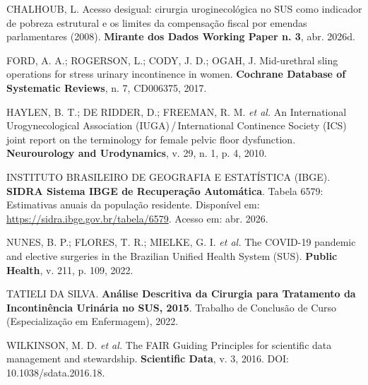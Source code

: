 \documentclass[12pt,a4paper,oneside]{article}
\begin{document}
\begin{singlespace}
\noindent\hangindent=1.25cm
CHALHOUB, L. Acesso desigual: cirurgia uroginecológica no SUS
como indicador de pobreza estrutural e os limites da
compensação fiscal por emendas parlamentares
(2008). \textbf{Mirante dos Dados \textemdash{}
Working Paper n. 3}, abr. 2026d.\par\smallskip

\noindent\hangindent=1.25cm
FORD, A. A.; ROGERSON, L.; CODY, J. D.; OGAH, J. Mid-urethral
sling operations for stress urinary incontinence in women.
\textbf{Cochrane Database of Systematic Reviews}, n. 7,
CD006375, 2017.\par\smallskip

\noindent\hangindent=1.25cm
HAYLEN, B. T.; DE RIDDER, D.; FREEMAN, R. M. \textit{et al.}
An International Urogynecological Association
(IUGA)\,/\,International Continence Society (ICS) joint report
on the terminology for female pelvic floor dysfunction.
\textbf{Neurourology and Urodynamics}, v. 29, n. 1,
p. 4, 2010.\par\smallskip

\noindent\hangindent=1.25cm
INSTITUTO BRASILEIRO DE GEOGRAFIA E ESTATÍSTICA (IBGE).
\textbf{SIDRA \textemdash{} Sistema IBGE de Recuperação Automática}.
Tabela 6579: Estimativas anuais da população residente.
Disponível em: \url{https://sidra.ibge.gov.br/tabela/6579}.
Acesso em: abr. 2026.\par\smallskip

\noindent\hangindent=1.25cm
NUNES, B. P.; FLORES, T. R.; MIELKE, G. I. \textit{et al.} The
COVID-19 pandemic and elective surgeries in the Brazilian
Unified Health System (SUS). \textbf{Public Health}, v. 211,
p. 109, 2022.\par\smallskip

\noindent\hangindent=1.25cm
TATIELI DA SILVA. \textbf{Análise Descritiva da Cirurgia para
Tratamento da Incontinência Urinária no SUS, 2015}.
Trabalho de Conclusão de Curso (Especialização em Enfermagem),
2022.\par\smallskip

\noindent\hangindent=1.25cm
WILKINSON, M. D. \textit{et al.} The FAIR Guiding Principles
for scientific data management and stewardship.
\textbf{Scientific Data}, v. 3, 2016.
DOI: 10.1038/sdata.2016.18.\par\smallskip
\end{singlespace}
\end{document}
